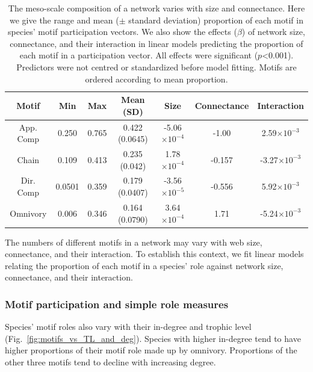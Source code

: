 \documentclass[12pt]{article}
\begin{document}
\begin{spacing}{2.0}
        
            \begin{table}[hb!]
            \centering
            \caption{The meso-scale composition of a network varies with size and connectance. Here we give the range and mean ($\pm$ standard deviation) proportion of each motif in species' motif participation vectors. 
            We also show the effects ($\beta$) of network size, connectance, and their interaction in linear models predicting the proportion of each motif in a participation vector.
            All effects were significant ($p$\textless0.001).
            Predictors were not centred or standardized before model fitting. Motifs are ordered according to mean proportion.}
            \label{tab:partic_vs_SC}   
            \footnotesize
            \begin{tabular}{c|c c c | c c c}
                Motif & Min & Max & Mean (SD) & Size & Connectance & Interaction \\
                \hline
                App. Comp & 0.250 & 0.765 & 0.422 (0.0645) & -5.06$\times10^{-4}$ & -1.00 & 2.59$\times10^{-3}$ \\
                Chain & 0.109 & 0.413 & 0.235 (0.042) & 1.78$\times10^{-4}$ & -0.157 & -3.27$\times10^{-3}$ \\
                Dir. Comp & 0.0501 & 0.359 & 0.179 (0.0407) & -3.56$\times10^{-5}$ & -0.556 & 5.92$\times10^{-3}$ \\
                Omnivory & 0.006 & 0.346 & 0.164 (0.0790) & 3.64$\times10^{-4}$ & 1.71 & -5.24$\times10^{-3}$ \\   
                \hline
                \end{tabular}
                \end{table}

        The numbers of different motifs in a network may vary with web size, connectance, and their interaction.
        To establish this context, we fit linear models relating the proportion of each motif in a species' role against network size, connectance, and their interaction.
    
        \subsubsection*{Motif participation and simple role measures}
        
            Species' motif roles also vary with their in-degree and trophic level (Fig.~\ref{fig:motifs_vs_TL_and_deg}).
            Species with higher in-degree tend to have higher proportions of their motif role made up by omnivory. Proportions of the other three motifs tend to decline with increasing degree.
            

\end{spacing}
\end{document}
